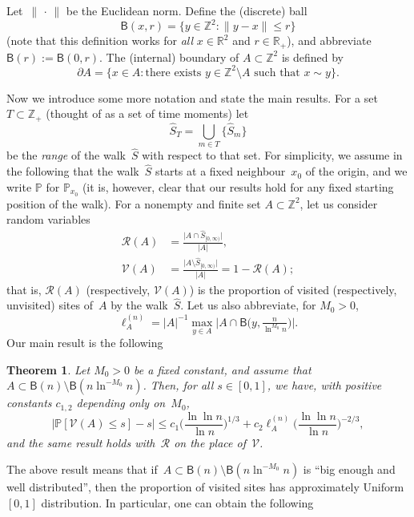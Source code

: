 \documentclass[10pt]{amsart}
\newtheorem{theo}{Theorem}[section]
\theoremstyle{definition}\newtheorem{defi}[theo]{Definition}\newtheorem{rema}[theo]{Remark}\newtheorem{exam}[theo]{Example}\newtheorem{exem}[theo]{Example}\newtheorem{nota}[theo]{Notation}
\newcommand{\1}[1]{{\mathbf 1}{\{#1\}}}
\newcommand{\Z}{\mathbb{Z}}
\newcommand{\V}{{\mathcal V}}
\newcommand{\RR}{{\mathcal R}}
\newcommand{\R}{{\mathbb R}}
\newcommand{\s}{{\widehat S}}
\newcommand{\8}{{\infty}}
\newcommand{\IP}{{\mathbb P}}
\newcommand{\B}{{\mathsf B}}
\begin{document}
Let~$\|{\,\cdot\,}\|$ be the Euclidean norm. Define the (discrete) ball
\[
\B(x,r) = \{y\in \Z^2: \|y-x\|\leq r\}
\]
(note that this definition works for \emph{all} $x\in\R^2$ and $r\in\R_+$), and abbreviate $\B(r):=\B(0,r)$. The (internal) boundary of $A\subset\Z^2$ is defined by
\[
\partial A = \{x\in A: \text{there exists }y\in \Z^2\setminus A
\text{ such that }x\sim y\}.
\]

Now we introduce some more notation and state the main results. For a set $T\subset\Z_+$ (thought of as a set of time moments) let
\[
\s_T=\bigcup_{m\in T}\big\{\s_m\big\}
\]
be the \emph{range} of the walk~$\s$ with respect to that set. For simplicity, we assume in the following that the walk~$\s$ starts at a fixed neighbour~$x_0$ of the origin, and we write $\IP$ for $\IP_{x_0}$ (it is, however, clear that our results hold for any fixed starting position of the walk). For a nonempty and finite set $A\subset \Z^2$, let us consider random variables
\begin{align*}
\RR(A) &= \frac{\big|A\cap \s_{[0,\infty)}\big|}{|A|},\\
\V(A) &= \frac{\big|A\setminus \s_{[0,\infty)}\big|}{|A|} = 1-\RR(A);
\end{align*}
that is, $\RR(A)$ (respectively, $\V(A)$) is the proportion of visited (respectively, unvisited) sites of~$A$ by the walk~$\s$. Let us also abbreviate, for $M_0 > 0$,
\begin{equation}\label{df_ell_A}
\ell^{(n)}_A= |A|^{-1}
\max_{y\in A}
\big|A\cap \B\big(y,{\tfrac{n}{\ln^{M_0}n}}\big)\big|.
\end{equation}
Our main result is the following
\begin{theo}\label{t_main_res}
Let $M_0>0$ be a fixed constant, and assume that $A\subset \B(n)\setminus \B(n\ln^{-M_0}n)$. Then, for all $s\in [0,1]$, we have, with positive constants $c_{1,2}$ depending only on~$M_0$,
\begin{equation}\label{main_res}
\big|\IP[\V(A)\leq s] - s\big|
\leq c_1\Big(\frac{\ln\ln n}{\ln n}\Big)^{1/3} + c_2\ell^{(n)}_A \Big(\frac{\ln\ln n}{\ln n}\Big)^{-2/3},
\end{equation}
and the same result holds with~$\RR$ on the place of~$\V$.
\end{theo}

The above result means that if~$A\subset \B(n)\setminus \B(n\ln^{-M_0}n)$ is ``big enough and well distributed'', then the proportion of visited sites has approximately Uniform$[0,1]$ distribution. In particular, one can obtain the following
\end{document}
